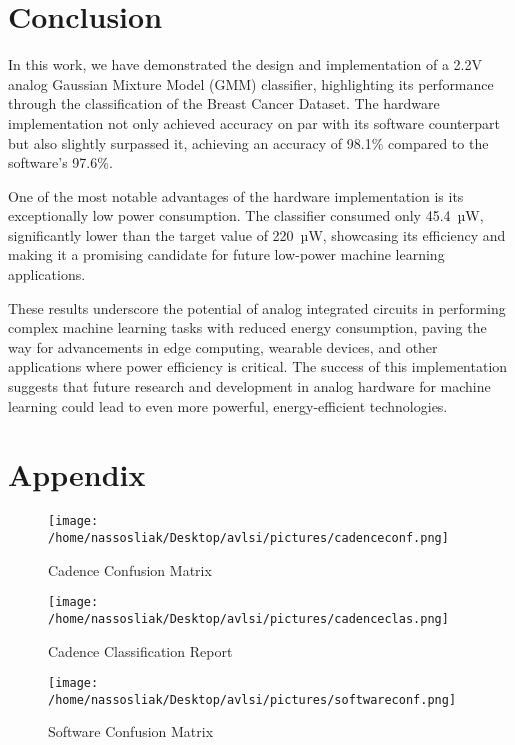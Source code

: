 \documentclass[conference]{IEEEtran}
\begin{document}
\section{\textbf{Conclusion}}

In this work, we have demonstrated the design and implementation of a 2.2V analog Gaussian Mixture Model (GMM) classifier, highlighting its performance through the classification of the Breast Cancer Dataset. The hardware implementation not only achieved accuracy on par with its software counterpart but also slightly surpassed it, achieving an accuracy of 98.1\% compared to the software's 97.6\%. 

One of the most notable advantages of the hardware implementation is its exceptionally low power consumption. The classifier consumed only 45.4~µW, significantly lower than the target value of 220~µW, showcasing its efficiency and making it a promising candidate for future low-power machine learning applications. 

These results underscore the potential of analog integrated circuits in performing complex machine learning tasks with reduced energy consumption, paving the way for advancements in edge computing, wearable devices, and other applications where power efficiency is critical. The success of this implementation suggests that future research and development in analog hardware for machine learning could lead to even more powerful, energy-efficient technologies.


 

\section{\textbf{Appendix}}

\begin{figure}[!h]
\Large
    \centering
    \texttt{[image: /home/nassosliak/Desktop/avlsi/pictures/cadenceconf.png]}
    \caption{Cadence Confusion Matrix}
    \label{fig:cadenceconf}
\end{figure}

\begin{figure}[!h]
    \centering
    \texttt{[image: /home/nassosliak/Desktop/avlsi/pictures/cadenceclas.png]}
    \caption{Cadence Classification Report}
    \label{fig:cadenceclas}
\end{figure}

\begin{figure}[!h]
    \centering
    \texttt{[image: /home/nassosliak/Desktop/avlsi/pictures/softwareconf.png]}
    \caption{Software Confusion Matrix}
    \label{fig:softwareconf}
\end{figure}
\end{document}
